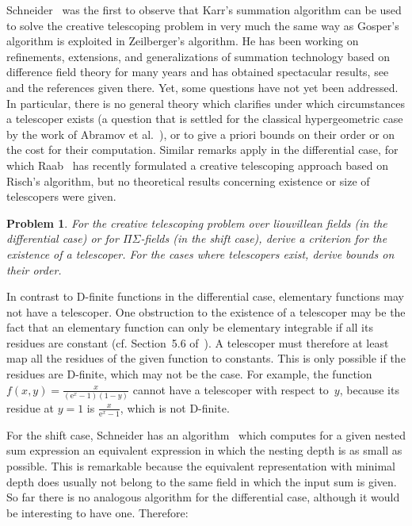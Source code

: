 \documentclass[a4paper,draft]{amsart}
\def\e{\mathrm{e}}
\newtheorem{problem}{Problem}
\begin{document}
 Schneider~\cite{schneider01} was the first to observe that Karr's summation algorithm
 can be used to solve the creative telescoping problem in very much the same way
 as Gosper's algorithm is exploited in Zeilberger's algorithm. He has been working
 on refinements, extensions, and generalizations of summation technology based on
 difference field theory for many years and has obtained spectacular results, see
 \cite{schneider13b} and the references given there. Yet, some questions have not yet
 been addressed. In particular, there is no general theory which clarifies
 under which circumstances a telescoper exists (a question that is settled for the
 classical hypergeometric case by the work of Abramov et al.~\cite{abramov02a,abramov02,abramov03,abramov05a}), or to
 give a priori bounds on their order or on the cost for their computation. Similar
 remarks apply in the differential case, for which Raab~\cite{raab12} has recently
 formulated a creative telescoping approach based on Risch's algorithm, but no
 theoretical results concerning existence or size of telescopers were given.

 \begin{problem}
   For the creative telescoping problem over liouvillean fields (in the differential case)
   or for $\Pi\Sigma$-fields (in the shift case), derive a criterion for the existence
   of a telescoper. For the cases where telescopers exist, derive bounds on their order.
 \end{problem}

 In contrast to D-finite functions in the differential case, elementary
 functions may not have a telescoper. One obstruction to the existence of a telescoper
 may be the fact that an elementary function can only be elementary integrable if
 all its residues are constant (cf. Section~5.6 of~\cite{bronstein97}). A telescoper
 must therefore at least map all the residues of the given function to constants. This
 is only possible if the residues are D-finite, which may not be the case. For example,
 the function $f(x,y)=\frac{x}{(\e^x-1)(1-y)}$ cannot have a telescoper with respect to~$y$,
 because its residue at $y=1$ is $\frac{x}{\e^x-1}$, which is not D-finite.

 For the shift case, Schneider has an algorithm~\cite{schneider05a} which computes for a given
 nested sum expression an equivalent expression in which the nesting depth is as small
 as possible. This is remarkable because the equivalent representation with minimal
 depth does usually not belong to the same field in which the input sum is given. So far
 there is no analogous algorithm for the differential case, although it would be
 interesting to have one. Therefore:
\end{document}

